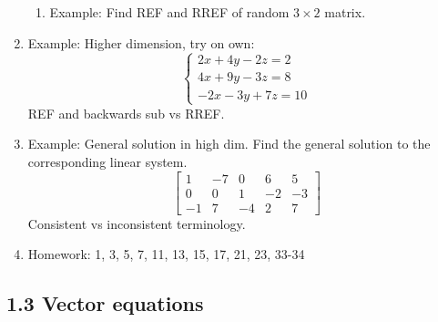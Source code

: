 \documentclass{article}
\begin{document}
\begin{enumerate}
\begin{enumerate}
\item Example: Find REF and RREF of random $3 \times 2$ matrix.

\end{enumerate}


\item Example: Higher dimension, try on own:
\[
\begin{cases}
2x+4y-2z = 2 \\
4x+9y-3z = 8 \\
-2x-3y+7z = 10
\end{cases}
\]
REF and backwards sub vs RREF.

\item Example: General solution in high dim. Find the general solution to the corresponding linear system.
\[
\left[
\begin{array}{cccc|c}
1 & -7 & 0 & 6 & 5 \\
0 & 0 & 1 & -2 & -3 \\
-1 & 7 & -4 & 2 & 7
\end{array}
\right]
\]
Consistent vs inconsistent terminology.


\item Homework: 1, 3, 5, 7, 11, 13, 15, 17, 21, 23, 33-34 

\end{enumerate}

\subsection{1.3 Vector equations}
\end{document}
